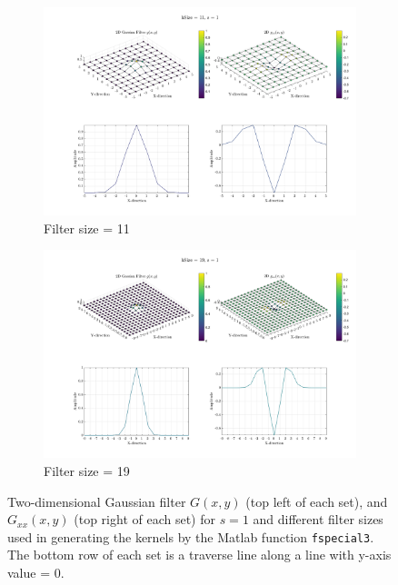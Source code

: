 \documentclass{edger}
\begin{document}
\begin{figure}[!h]
    \begin{subfigure}[b]{0.4\textwidth}            
            \includegraphics[width=\textwidth]{"s = 1, hSize = 11_normalized"}
            \caption{Filter size = 11}
            \label{fig:Filter size 11}
    \end{subfigure}%
    \begin{subfigure}[b]{0.4\textwidth}
            \centering
            \includegraphics[width=\textwidth]{"s = 1, hSize = 19_normalized"}
            \caption{Filter size = 19}
            \label{fig:Filter size 19}
    \end{subfigure}
    
    \caption{Two-dimensional Gaussian filter $G(x,y)$ (top left of each set), and $G_{xx}(x,y)$ (top right of each set) for $s = 1$ and different filter sizes used in generating the kernels by the Matlab function \texttt{fspecial3}. The bottom row of each set is a traverse line along a line with y-axis value = 0.}
    \label{fig:Filters}
\end{figure}
\end{document}
